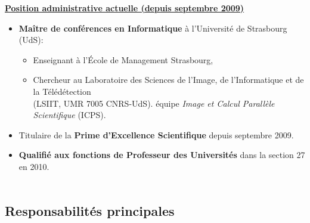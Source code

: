 \documentclass[11pt]{article}
\begin{document}
\vspace{6mm}
\textbf{\underline{Position administrative actuelle (depuis septembre 2009)}}
\vspace{5mm}

\begin{itemize}
\item
 	\textbf{Maître de conférences en Informatique} à l'Université de Strasbourg (UdS):
	\begin{itemize}
		\item Enseignant à l'\'Ecole de Management Strasbourg,
		\item Chercheur au Laboratoire des Sciences de l'Image, de 
		      l'Informatique et de la Télédétection \\
			(LSIIT, UMR 7005 CNRS-UdS).
équipe \textit{Image et Calcul Parallèle Scientifique} (ICPS).
\\[1mm]
	\end{itemize}

\item Titulaire de la \textbf{Prime d'Excellence Scientifique} depuis septembre 2009.\\

\item \textbf{Qualifié aux fonctions de Professeur des Universités} dans la 
              section 27 en 2010.\\
	\\[2mm]
\end{itemize}


\vspace{-1mm}
\subsection{Responsabilités principales}
\end{document}
